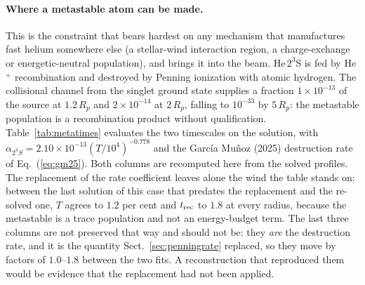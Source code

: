 \documentclass[english,a4paper]{my_memo}
\begin{document}
\paragraph{Where a metastable atom can be made.}
This is the constraint that bears hardest on any mechanism that manufactures
fast helium somewhere else (a stellar-wind interaction region, a
charge-exchange or energetic-neutral population), and brings it into the
beam. He\,$2^3$S is fed by He$^+$ recombination and destroyed by Penning
ionization with atomic hydrogen. The collisional channel from the singlet
ground state supplies a fraction $1\times 10^{-13}$ of the source at
$1.2\,R_p$ and $2\times 10^{-14}$ at $2\,R_p$, falling to $10^{-33}$ by
$5\,R_p$: the metastable population is a recombination product without
qualification. Table~\ref{tab:metatimes} evaluates the two timescales on the
solution, with $\alpha_{2^3S} = 2.10\times 10^{-13}(T/10^4)^{-0.778}$ and the
Garc\'ia Mu\~noz (2025) destruction rate of Eq.~(\ref{eq:gm25}). Both columns
are recomputed here from the solved profiles. The replacement of the rate
coefficient leaves alone the wind the table stands on: between the last
solution of this case that predates the replacement and the re-solved one,
$T$ agrees to $1.2$ per cent and $t_{\rm rec}$ to $1.8$ at every radius,
because the metastable is a trace population and not an energy-budget term.
The last three columns are not preserved that way and should not be: they
\emph{are} the destruction rate, and it is the quantity
Sect.~\ref{sec:penningrate} replaced, so they move by factors of $1.0$--$1.8$
between the two fits. A reconstruction that reproduced them would be evidence
that the replacement had not been applied.
\end{document}
